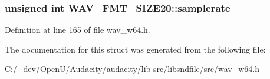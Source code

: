 \subsubsection[{\texorpdfstring{samplerate}{samplerate}}]{\setlength{\rightskip}{0pt plus 5cm}unsigned {\bf int} W\+A\+V\+\_\+\+F\+M\+T\+\_\+\+S\+I\+Z\+E20\+::samplerate}\hypertarget{struct_w_a_v___f_m_t___s_i_z_e20_a4526766461389f27c1d0e72ae46ad9b8}{}\label{struct_w_a_v___f_m_t___s_i_z_e20_a4526766461389f27c1d0e72ae46ad9b8}


Definition at line 165 of file wav\+\_\+w64.\+h.



The documentation for this struct was generated from the following file\+:\begin{DoxyCompactItemize}
\item 
C\+:/\+\_\+dev/\+Open\+U/\+Audacity/audacity/lib-\/src/libsndfile/src/\hyperlink{wav__w64_8h}{wav\+\_\+w64.\+h}\end{DoxyCompactItemize}
